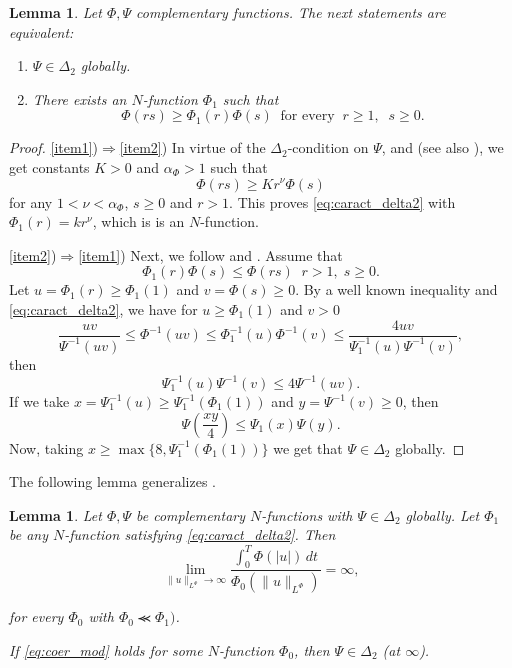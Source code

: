 \documentclass[twoside]{article}
\newtheorem{lem}[thm]{Lemma}
\theoremstyle{remark}
\newcommand{\orlnor}{\|_{L^{\Phi}}}
\renewcommand{\leq}{\leqslant}
\renewcommand{\geq}{\geqslant}
\begin{document}
\begin{lem}
Let $\Phi,\Psi$ complementary functions.
The next statements are equivalent:
\begin{enumerate}
\item\label{item1} $\Psi \in \Delta_2$ globally.
\item\label{item2} There exists an $N$-function $\Phi_1$ such that
\begin{equation}\label{eq:caract_delta2}
\Phi(rs)\geq \Phi_1(r)\Phi(s)\;\;\mbox{for every}\;\;r\geq1,\;\;s\geq 0.
\end{equation}
\end{enumerate}
\end{lem}

\begin{proof}
\ref{item1})$\Rightarrow$\ref{item2})
In virtue of the $\Delta_2$-condition on $\Psi$, \cite[Thm. 11.7]{M} and \cite[Cor. 11.6]{M} (see also  \cite[Eq. (2.8)]{AGMS}), we get constants $K>0$ and $\alpha_{\Phi}>1$ such that
\begin{equation}\label{delta2-consecuencia}
\Phi(r s)\geq Kr^{\nu}\Phi(s)
\end{equation}
for any $1<\nu<\alpha_{\Phi}$,  $s\geq 0$ and $r>1$. This proves  \eqref{eq:caract_delta2} with $\Phi_1(r)=kr^\nu$, which is is an $N$-function.

\ref{item2})$\Rightarrow$\ref{item1})
Next, we follow  \cite[p. 32, Prop. 13]{rao1991theory} and \cite[p. 29, Prop. 9]{rao1991theory}.
Assume that 
\[
\Phi_1(r)\Phi(s)\leq \Phi(rs)\;\;r>1,\;s\geq 0.
\]
Let $u=\Phi_1(r)\geq \Phi_1(1)$ and $v=\Phi(s)\geq 0$. By a well known inequality \cite[p. 13, Prop. 1]{rao1991theory} and \eqref{eq:caract_delta2},  we have  for $u\geq \Phi_1(1)$ and $v> 0$
\[
\frac{uv}{\Psi^{-1}(uv)}\leq \Phi^{-1}(uv)\leq\Phi_1^{-1}(u)\Phi^{-1}(v)\leq
\frac{4uv}{\Psi_1^{-1}(u)\Psi^{-1}(v)},
\]
then 
\[
\Psi^{-1}_1(u)\Psi^{-1}(v)\leq 4 \Psi^{-1}(uv).
\]
If we take $x=\Psi^{-1}_1(u)\geq \Psi^{-1}_1(\Phi_1(1))$ and $y=\Psi^{-1}(v)\geq 0$, then 
\[
\Psi\left(\frac{xy}{4}\right)\leq \Psi_1(x)\Psi(y).
\]
Now, taking  $x\geq \max\{8,\Psi_1^{-1}(\Phi_1(1))\}$ we get that $\Psi \in \Delta_2$ globally.
\end{proof}

The following lemma generalizes \cite[Lemma 5.2]{ABGMS2015}.

\begin{lem}\label{lem_coer}
Let $\Phi,\Psi$ be complementary $N$-functions with $\Psi \in \Delta_2$ globally. Let $\Phi_1$ be any $N$-function satisfying \eqref{eq:caract_delta2}. Then
\begin{equation}\label{eq:coer_mod}
\lim\limits_{\|u\orlnor\to \infty}
\frac{\int_0^T \Phi(|u|)\,dt}{\Phi_0(\|u\orlnor)}=\infty,
\end{equation}


for every $\Phi_0$ with $\Phi_0\llcurly\Phi_1)$.

If  \eqref{eq:coer_mod} holds for some $N$-function $\Phi_0$,  then $\Psi\in\Delta_2$ (at $\infty$).
\end{lem}
\end{document}
